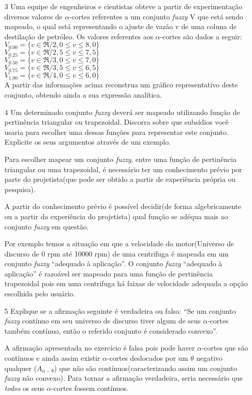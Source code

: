\documentclass{report}
\begin{document}
\begin{enumerate}
\item[3] Uma equipe de engenheiros e cientistas obteve a partir de experimentação diversos valores de
$\alpha$-cortes referentes a um conjunto \emph{fuzzy} V que está sendo mapeado, o qual está representando o
ajuste de vazão v de uma coluna de destilação de petróleo. Os valores referentes aos $\alpha$-cortes são
dados a seguir:\\
$V_{0.00} = \{v \in \Re / 2,0 \leq v \leq 8,0\}$\\
$V_{0.25} = \{v \in \Re / 2,5 \leq v \leq 7,5\}$\\
$V_{0.50} = \{v \in \Re / 3,0 \leq v \leq 7,0\}$\\
$V_{0.75} = \{v \in \Re / 3,5 \leq v \leq 6,5\}$\\
$V_{1.00} = \{v \in \Re / 4,0 \leq v \leq 6,0\}$\\
A partir das informações acima reconstrua um gráfico representativo deste conjunto, obtendo
ainda a sua expressão analítica.


\item[4] Um determinado conjunto \emph{fuzzy} deverá ser mapeado utilizando função de pertinência
triangular ou trapezoidal. Discorra sobre que subsídios você usaria para escolher uma dessas
funções para representar este conjunto. Explicite os seus argumentos através de um exemplo.

Para escolher mapear um conjunto \emph{fuzzy}, entre uma função de pertinência triangular ou uma trapezoidal, 
é necessário ter um conhecimento prévio por parte do projetista(que pode ser obtido a partir de experiência própria 
ou pesquisa). 

A partir do conhecimento prévio é possível decidir(de forma algebricamente ou a partir da experiência do projetista)
qual função se adéqua mais ao conjunto \emph{fuzzy} em questão. 

Por exemplo temos a situação em que a velocidade do motor(Universo de discurso de 0 rpm até 10000 rpm) de uma centrifuga é mapeada 
em um conjunto \emph{fuzzy} ``adequado à aplicação''. O conjunto \emph{fuzzy} ``adequado à aplicação'' é razoável ser mapeado
para uma função de pertinência trapezoidal pois em uma centrifuga há faixas de velocidade adequada a opção escolhida pelo usuário.


\item[5] Explique se a afirmação seguinte é verdadeira ou falsa: “Se um conjunto \emph{fuzzy} contínuo em
seu universo de discurso tiver algum de seus $\alpha$-cortes também contínuo, então o referido
conjunto é considerado convexo”.

A afirmação apresentada no exercício é falsa pois pode haver $\alpha$-cortes que são contínuos e ainda assim 
existir $\alpha$-cortes deslocados por um $\theta$ negativo qualquer ($A_{\alpha-\theta}$) que não são contínuos(caracterizando
assim um conjunto \emph{fuzzy} não convexo). Para tornar a afirmação verdadeira, seria necessário que \emph{todos} os seus $\alpha$-cortes 
fossem contínuos.


\end{enumerate}
\end{document}
